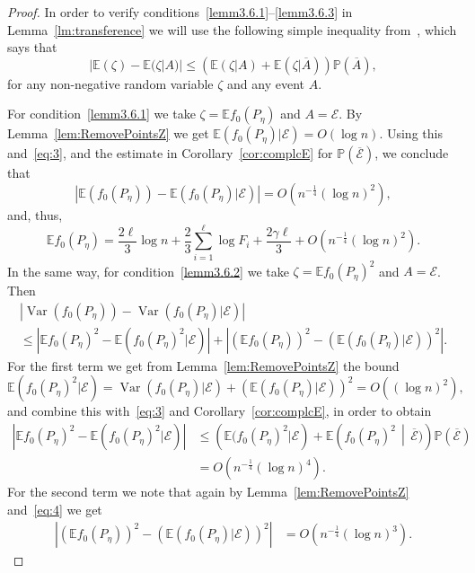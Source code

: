 \documentclass[10pt]{amsart}
\theoremstyle{definition}\newtheorem{defi}[theo]{Definition}\newtheorem{rema}[theo]{Remark}\newtheorem{exam}[theo]{Example}\newtheorem{exem}[theo]{Example}\newtheorem{nota}[theo]{Notation}
\newcommand{\var}{\operatorname{Var}}
\newcommand{\bbE}{\mathbb{E}}
\newcommand{\bbP}{\mathbb{P}}
\newcommand{\clE}{\mathcal{E}}
\begin{document}
\begin{proof}
In order to verify conditions~\eqref{lemm3.6.1}--\eqref{lemm3.6.3} in Lemma~\ref{lm:transference} we will use the following simple inequality from~\cite[Claim~8.3]{BR10}, which says that
\[
|\bbE(\zeta)-\bbE(\zeta|A)|\leq \left(\bbE(\zeta|A)+\bbE(\zeta|\overline{A})\right)\bbP(\overline{A}),
\]
for any non-negative random variable $\zeta$ and any event $A$.

For condition~\eqref{lemm3.6.1} we take $\zeta = \bbE f_0(P_{\eta})$ and $A=\clE$. By Lemma~\ref{lem:RemovePointsZ} we get $ \bbE (f_0(P_{\eta})|\clE) = O(\log n)$. Using this and~\eqref{eq:3}, and the estimate in Corollary~\ref{cor:complcE} for $\bbP (\overline{\clE})$, we conclude that
\begin{equation}\label{eq:4}
\left|\bbE\left(f_0(P_{\eta})\right)-\bbE\left(f_0(P_{\eta})|\clE\right)\right| = O\left(n^{-\frac 14}(\log n)^2\right),
\end{equation}
and, thus,
\begin{equation}\label{eq:EE-Poiss}
\bbE f_0(P_{\eta}) = \frac{2 \ell}{3}\log n + \frac 23 \sum_{i=1}^\ell \log F_i + \frac{2 \gamma \ell }3 + O\left(n^{-\frac 14}(\log n)^2\right).
\end{equation}
In the same way, for condition~\eqref{lemm3.6.2} we take $\zeta =\bbE f_0(P_{\eta})^2$ and $A=\clE$. Then
\begin{multline*}
\left|\var(f_0(P_{\eta}))-\var(f_0(P_{\eta})|\clE)\right|\\
\leq \left|\bbE f_0(P_{\eta})^2-\bbE\left(f_0(P_{\eta})^2|\clE\right)\right| +\left|\left(\bbE f_0(P_{\eta})\right)^2-\left(\bbE(f_0(P_{\eta})|\clE)\right)^2\right|.
\end{multline*}
For the first term we get from Lemma~\ref{lem:RemovePointsZ} the bound
\[
\bbE\left(f_0(P_{\eta})^2|\clE\right) =
\var (f_0(P_{\eta})|\clE) + (\bbE (f_0(P_{\eta})|\clE))^2 = O\left((\log n)^2\right),
\]
and combine this with~\eqref{eq:3} and Corollary~\ref{cor:complcE}, in order to obtain
\begin{align*}
\left|\bbE f_0(P_{\eta})^2-\bbE\left(f_0(P_{\eta})^2|\clE\right)\right|&\leq \left(\bbE(f_0(P_{\eta})^2|\clE\right)+\bbE\left(f_0(P_{\eta})^2\,\middle|\,\overline{\clE})\right)\bbP(\overline{\clE})\\
& = O\left(n^{-\frac 14}(\log n)^4\right).
\end{align*}
For the second term we note that again by Lemma~\ref{lem:RemovePointsZ} and~\eqref{eq:4} we get
\begin{align*}
\left|\left(\bbE f_0(P_{\eta})\right)^2-\left(\bbE(f_0(P_{\eta})|\clE)\right)^2\right| & = O\left(n^{-\frac 14} (\log n)^3\right).

\end{align*}
\end{proof}
\end{document}
